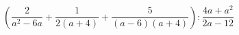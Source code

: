 \begin{ex}[type=expression]
	\begin{condition}
		\(\left( \dfrac{2}{a^2-6a}+\dfrac{1}{2(a+4)}+\dfrac{5}{(a-6)(a+4)} \right):\dfrac{4a+a^2}{2a-12}\)
	\end{condition}
\end{ex}